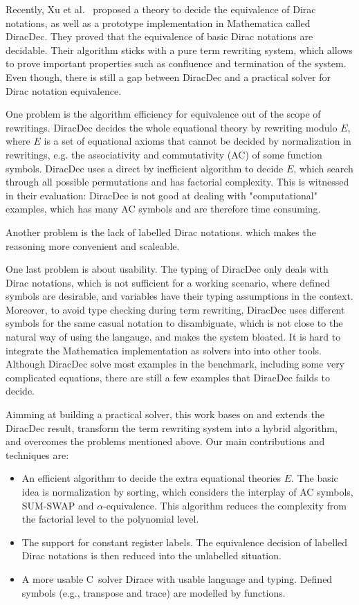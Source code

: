 \documentclass[runningheads]{llncs}
\newcommand{\CC}{C\nolinebreak\hspace{-.05em}\raisebox{.4ex}{\tiny\bf +}\nolinebreak\hspace{-.10em}\raisebox{.4ex}{\tiny\bf +}}
\def\CC{{C\nolinebreak[4]\hspace{-.05em}\raisebox{.4ex}{\tiny\bf ++}}}
\begin{document}
Recently, Xu et al.~\cite{diracdec} proposed a theory to decide the equivalence of Dirac notations, as well as a prototype implementation in Mathematica called DiracDec.
They proved that the equivalence of basic Dirac notations are decidable.
Their algorithm sticks with a pure term rewriting system, which allows to prove important properties such as confluence and termination of the system.
Even though, there is still a gap between DiracDec and a practical solver for Dirac notation equivalence.

One problem is the algorithm efficiency for equivalence out of the scope of rewritings. DiracDec decides the whole equational theory by rewriting modulo $E$, where $E$ is a set of equational axioms that cannot be decided by normalization in rewritings, e.g. the associativity and commutativity (AC) of some function symbols. DiracDec uses a direct by inefficient algorithm to decide $E$, which search through all possible permutations and has factorial complexity.
This is witnessed in their evaluation: DiracDec is not good at dealing with "computational" examples, which has many AC symbols and are therefore time consuming.

Another problem is the lack of labelled Dirac notations.
which makes the reasoning more convenient and scaleable.

One last problem is about usability.
The typing of DiracDec only deals with Dirac notations, which is not sufficient for a working scenario, where defined symbols are desirable, and variables have their typing assumptions in the context.
Moreover, to avoid type checking during term rewriting, DiracDec uses different symbols for the same casual notation to disambiguate, which 
is not close to the natural way of using the langauge, and makes the system bloated.
It is hard to integrate the Mathematica implementation as solvers into into other tools.  
Although DiracDec solve most examples in the benchmark, including some very complicated equations, there are still a few examples that DiracDec failds to decide.



Aimming at building a practical solver, this work bases on and extends the DiracDec result, transform the term rewriting system into a hybrid algorithm, and overcomes the problems mentioned above. Our main contributions and techniques are:
\begin{itemize}
    \item An efficient algorithm to decide the extra equational theories $E$. The basic idea is normalization by sorting, which considers the interplay of AC symbols, SUM-SWAP and $\alpha$-equivalence. This algorithm reduces the complexity from the factorial level to the polynomial level.
    \item The support for constant register labels. The equivalence decision of labelled Dirac notations is then reduced into the unlabelled situation.
    \item A more usable \CC\ solver Dirace with usable language and typing. Defined symbols (e.g., transpose and trace) are modelled by functions.
\end{itemize}
\end{document}
